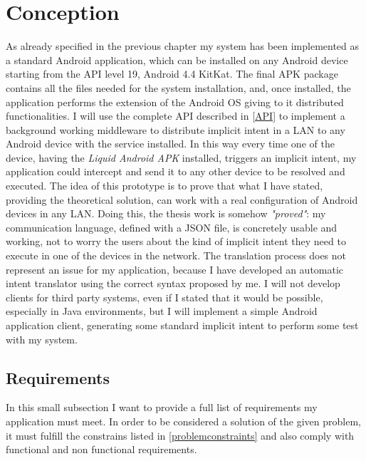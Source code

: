 \section{Conception}
As already specified in the previous chapter my system has been implemented as a standard Android application, which can be installed on any Android device starting from the API level 19, Android 4.4 KitKat. The final APK package contains all the files needed for the system installation, and, once installed, the application performs the extension of the Android OS giving to it distributed functionalities. I will use the complete API described in \ref{API} to implement a background working middleware to distribute implicit intent in a LAN to any Android device with the service installed. In this way every time one of the device, having the \textit{Liquid Android APK}
installed, triggers an implicit intent, my application could intercept and send it to any other device to be resolved and executed. The idea of this prototype is to prove that what I have stated, providing the theoretical solution, can work with a real configuration of Android devices in any LAN. Doing this, the thesis work is somehow \textit{"proved"}: my communication language, defined with a JSON file, is concretely usable and working, not to worry the users about the kind of implicit intent they need to execute in one of the devices in the network. The translation process does not represent an issue for my application, because I have developed an automatic intent translator using the correct syntax proposed by me. I will not develop clients for third party systems, even if I stated that it would be possible, especially in Java environments, but I will implement a simple Android application client, generating some standard implicit intent to perform some test with my system.
\subsection{Requirements}
In this small subsection I want to provide a full list of requirements my application must meet. In order to be considered a solution of the given problem, it must fulfill the constrains listed in \ref{problemconstraints} and also comply with functional and non functional requirements.

